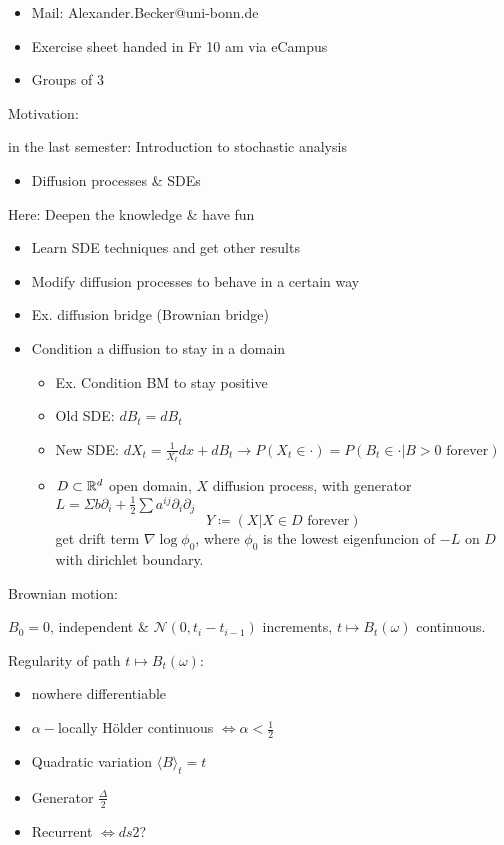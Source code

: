 {\huge{}}
\begin{itemize}
    \item Mail: Alexander.Becker@uni-bonn.de
    \item Exercise sheet handed in Fr 10 am via eCampus
    \item Groups of 3
\end{itemize}

Motivation:

in the last semester: Introduction to stochastic analysis
\begin{itemize}
    \item Diffusion processes \& SDEs
\end{itemize}
Here: Deepen the knowledge \& have fun
\begin{itemize}
    \item Learn SDE techniques and get other results
    \item Modify diffusion processes to behave in a certain way
    \item Ex. diffusion bridge (Brownian bridge)
    \item Condition a diffusion to stay in a domain\begin{itemize}
        \item Ex. Condition BM to stay positive
        \item Old SDE: $dB_t=dB_t$
        \item New SDE: $dX_t = \frac{1}{X_t}dx+dB_t\to P(X_t\in\cdot)=P(B_t\in\cdot|B>0\text{ forever})$
        \item $D\subset\mathbb{R}^d$ open domain, $X$ diffusion process, with generator $L=\Sigma b\partial_i+\frac{1}{2}\sum a^{ij}\partial_i\partial_j$ \[Y\coloneq( X|X\in D\text{ forever})\] get drift term $\nabla \log\phi_0$, where $\phi_0$ is the lowest eigenfuncion of $-L$ on $D$ with dirichlet boundary.
    \end{itemize}
\end{itemize}


Brownian motion:

\begin{adefinition}
    $B_0=0$, independent \& $\mathcal{N}(0,t_i-t_{i-1})$ increments, $t\mapsto B_t(\omega)$ continuous.
\end{adefinition}

Regularity of path $t\mapsto B_t(\omega)$:
\begin{itemize}
    \item nowhere differentiable 
    \item $\alpha-$locally Hölder continuous $\iff \alpha<\frac{1}{2}$
    \item Quadratic variation $\langle B\rangle_t=t$
    \item Generator $\frac{\Delta}{2}$
    \item Recurrent $\iff ds2$?
\end{itemize}

